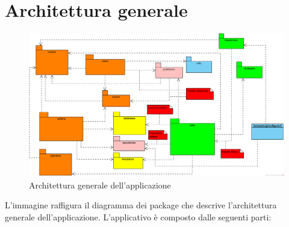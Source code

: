 \section{Architettura generale} \label{archGen}

    \begin{figure}[htbp]
        \centering
        \includegraphics[width=\textwidth]{./img/ArchitetturaGenerale/generalArchitecture.png}
        \caption[Architettura generale della applicazione]{Architettura generale dell'applicazione}
    \end{figure}
    
    L'immagine raffigura il diagramma dei package che descrive l'architettura generale dell'applicazione.
    L'applicativo è composto dalle seguenti parti:

